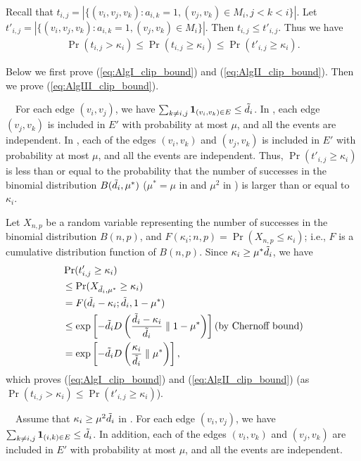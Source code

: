 {Recall that
$t_{i,j} = |\{(v_i,v_j,v_k) : a_{i,k} = 1, (v_j,v_k) \in M_i, j<k<i \}|$.
Let
$t'_{i,j} = |\{(v_i,v_j,v_k) : a_{i,k} = 1, (v_j,v_k) \in M_i \}|$.
Then $t_{i,j} \leq t'_{i,j}$.
Thus we have
\begin{align*}
    \Pr(t_{i,j} > \kappa_i) \leq \Pr(t_{i,j} \geq \kappa_i) \leq \Pr(t'_{i,j} \geq \kappa_i).
\end{align*}

Below we first prove (\ref{eq:AlgI_clip_bound}) and (\ref{eq:AlgII_clip_bound}). Then we prove (\ref{eq:AlgIII_clip_bound}).

\smallskip
{}~~For each edge $(v_i,v_j)$, we have $\sum_{k \ne i,j} \textbf{1}_{(v_i,v_k) \in E} \leq \tilde{d}_i$.
In \AlgOne{}, each edge $(v_j,v_k)$ is included in $E'$ with probability at most $\mu$, and all the events are independent.
In \AlgTwo{}, each of the edges $(v_i,v_k)$ and $(v_j,v_k)$ is included in $E'$ with probability at most $\mu$, and all the events are independent.
Thus, $\Pr(t'_{i,j} \geq \kappa_i)$ is less than or equal to the probability that the number of successes in the binomial distribution $B(\tilde{d}_i, \mu^*)$ ($\mu^* = \mu$ in \AlgOne{} and $\mu^2$ in \AlgTwo{}) is larger than or equal to $\kappa_i$.

Let $X_{n,p}$ be a random variable representing the number of successes in the binomial distribution $B(n,p)$, and $F(\kappa_i;n,p) = \Pr(X_{n,p} \leq \kappa_i)$; i.e., $F$ is a cumulative distribution function of $B(n,p)$.
Since $\kappa_i \geq \mu^* \tilde{d}_i$, we have
\begin{align*}
    &\Pr(t'_{i,j} \geq \kappa_i) \\
    &\leq \Pr(X_{\tilde{d}_i, \mu^*} \geq \kappa_i) \\
    &= F(\tilde{d}_i - \kappa_i; \tilde{d}_i, 1-\mu^*) \\
    &\leq \exp \left[-\tilde{d}_i D \left(\frac{\tilde{d}_i - \kappa_i}{\tilde{d}_i} \parallel 1-\mu^* \right) \right]  \text{(by Chernoff bound)}\\
    &= \exp \left[-\tilde{d}_i D \left(\frac{\kappa_i}{\tilde{d}_i} \parallel \mu^* \right) \right],
\end{align*}
which proves (\ref{eq:AlgI_clip_bound}) and (\ref{eq:AlgII_clip_bound}) (as $\Pr(t_{i,j} > \kappa_i) \leq \Pr(t'_{i,j} \geq \kappa_i)$).

\smallskip
{}~~Assume that $\kappa_i \geq \mu^2 \tilde{d}_i$ in \AlgThree{}.
For each edge $(v_i,v_j)$, we have $\sum_{k \ne i,j} \textbf{1}_{(i,k) \in E} \leq \tilde{d}_i$.
In addition, each of the edges $(v_i,v_k)$ and
$(v_j,v_k)$ are included in $E'$ with probability at most $\mu$, and all the events are independent.

}
